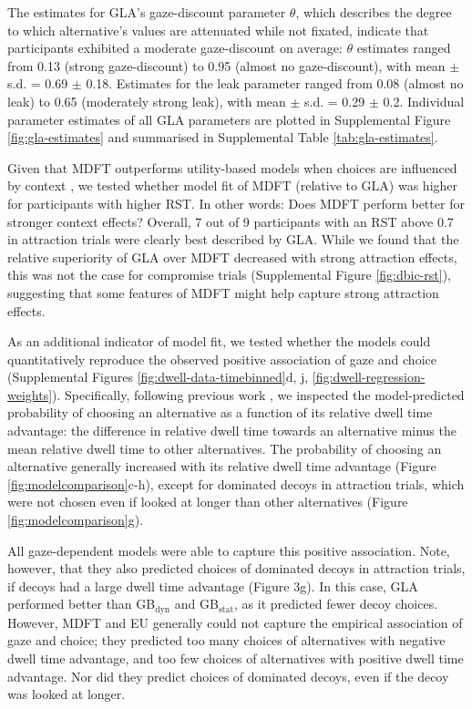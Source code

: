 \documentclass[11pt, a4paper]{article}
\begin{document}
The estimates for GLA’s gaze-discount parameter $\theta$, which describes the degree to which alternative’s values are attenuated while not fixated, indicate that participants exhibited a moderate gaze-discount on average: $\theta$ estimates ranged from 0.13 (strong gaze-discount) to 0.95 (almost no gaze-discount), with mean $\pm$ s.d. = 0.69 $\pm$ 0.18. Estimates for the leak parameter ranged from 0.08 (almost no leak) to 0.65 (moderately strong leak), with mean $\pm$ s.d. = 0.29 $\pm$ 0.2. Individual parameter estimates of all GLA parameters are plotted in Supplemental Figure \ref{fig:gla-estimates} and summarised in Supplemental Table \ref{tab:gla-estimates}.

Given that MDFT outperforms utility-based models when choices are influenced by context \parencite{berkowitsch2014RigorouslyTestingMultialternative}, we tested whether model fit of MDFT (relative to GLA) was higher for participants with higher RST. In other words: Does MDFT perform better for stronger context effects? Overall, 7 out of 9 participants with an RST above 0.7 in attraction trials were clearly best described by GLA. While we found that the relative superiority of GLA over MDFT decreased with strong attraction effects, this was not the case for compromise trials (Supplemental Figure \ref{fig:dbic-rst}), suggesting that some features of MDFT might help capture strong attraction effects.

As an additional indicator of model fit, we tested whether the models could quantitatively reproduce the observed positive association of gaze and choice (Supplemental Figures \ref{fig:dwell-data-timebinned}d, j, \ref{fig:dwell-regression-weights}). Specifically, following previous work \parencite{krajbich2010VisualFixationsComputation,krajbich2011MultialternativeDriftdiffusionModel}, we inspected the model-predicted probability of choosing an alternative as a function of its relative dwell time advantage: the difference in relative dwell time towards an alternative minus the mean relative dwell time to other alternatives. The probability of choosing an alternative generally increased with its relative dwell time advantage (Figure \ref{fig:modelcomparison}c-h), except for dominated decoys in attraction trials, which were not chosen even if looked at longer than other alternatives (Figure \ref{fig:modelcomparison}g).

All gaze-dependent models were able to capture this positive association. Note, however, that they also predicted choices of dominated decoys in attraction trials, if decoys had a large dwell time advantage (Figure 3g). In this case, GLA performed better than GB$_{\text{dyn}}$ and GB$_{\text{stat}}$, as it predicted fewer decoy choices. However, MDFT and EU generally could not capture the empirical association of gaze and choice; they predicted too many choices of alternatives with negative dwell time advantage, and too few choices of alternatives with positive dwell time advantage. 
Nor did they predict choices of dominated decoys, even if the decoy was looked at longer.
\end{document}
